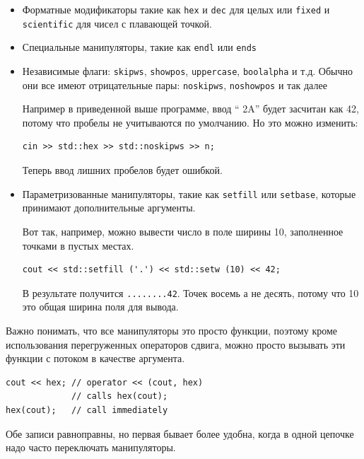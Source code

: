 \documentclass[a4paper,12pt,oneside]{book}
\begin{document}
\begin{itemize}
\item Форматные модификаторы такие как \lstinline!hex! и \lstinline!dec! для целых или \lstinline!fixed! и \lstinline!scientific! для чисел с плавающей точкой.

\item Специальные манипуляторы, такие как \lstinline!endl! или \lstinline!ends!

\item Независимые флаги: \lstinline!skipws!, \lstinline!showpos!, \lstinline!uppercase!, \lstinline!boolalpha! и т.д. Обычно они все имеют отрицательные пары: \lstinline!noskipws!, \lstinline!noshowpos! и так далее

Например в приведенной выше программе, ввод ``  2A'' будет засчитан как 42, потому что пробелы не учитываются по умолчанию. Но это можно изменить:

\begin{lstlisting}
cin >> std::hex >> std::noskipws >> n;
\end{lstlisting}

Теперь ввод лишних пробелов будет ошибкой.

\item Параметризованные манипуляторы, такие как \lstinline!setfill! или \lstinline!setbase!, которые принимают дополнительные аргументы.

Вот так, например, можно вывести число в поле ширины 10, заполненное точками в пустых местах.

\begin{lstlisting}
cout << std::setfill ('.') << std::setw (10) << 42;
\end{lstlisting}

В результате получится \lstinline!........42!. Точек восемь а не десять, потому что 10 это общая ширина поля для вывода.

\end{itemize}

Важно понимать, что все манипуляторы это просто функции, поэтому кроме использования перегруженных операторов сдвига, можно просто вызывать эти функции с потоком в качестве аргумента.

\begin{lstlisting}
cout << hex; // operator << (cout, hex)
             // calls hex(cout);
hex(cout);   // call immediately
\end{lstlisting}

Обе записи равноправны, но первая бывает более удобна, когда в одной цепочке надо часто переключать манипуляторы.
\end{document}
